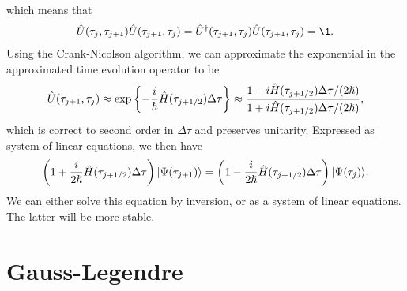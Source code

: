         which means that
        \begin{align}
            \hat{U}(\tau_j, \tau_{j + 1})
            \hat{U}(\tau_{j + 1}, \tau_j)
            = \hat{U}^{\dagger}(\tau_{j + 1}, \tau_j)
            \hat{U}(\tau_{j + 1}, \tau_j)
            = \1.
        \end{align}
        Using the Crank-Nicolson algorithm, we can approximate the exponential
        in the approximated time evolution operator to be
        \begin{align}
            \hat{U}(\tau_{j + 1}, \tau_j)
            \approx \exp\left\{ 
                -\frac{i}{\hslash}\hat{H}(\tau_{j + 1/2})\Delta \tau
             \right\}
            \approx
            \frac{1 - i\hat{H}(\tau_{j + 1/2})\Delta\tau/(2\hslash)}
            {1 + i\hat{H}(\tau_{j + 1/2})\Delta\tau/(2\hslash)},
        \end{align}
        which is correct to second order in $\Delta \tau$ and preserves
        unitarity. Expressed as system of linear equations, we then have
        \begin{align}
            \left( 
                1 + \frac{i}{2\hslash}\hat{H}(\tau_{j + 1/2})\Delta\tau
             \right)| \Psi(\tau_{j + 1}) \rangle
            =
            \left( 
                1 - \frac{i}{2\hslash}\hat{H}(\tau_{j + 1/2})\Delta\tau
             \right)| \Psi(\tau_{j}) \rangle.
        \end{align}
        We can either solve this equation by inversion, or as a system of linear
        equations. The latter will be more stable.

    \section{Gauss-Legendre}

